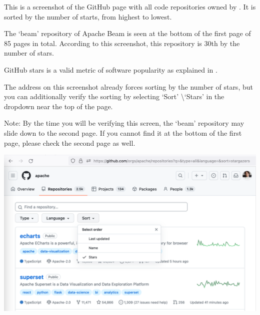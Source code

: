 
This is a screenshot of the GitHub page with all code repositories owned by \Asf.
It is sorted by the number of starts, from highest to lowest.

The `beam' repository of Apache Beam is seen at the bottom of the first page of 85 pages in total.
According to this screenshot, this repository is 30th by the number of stars.

GitHub stars is a valid metric of software popularity as explained in .

The address on this screenshot already forces sorting by the number of stars,
but you can additionally verify the sorting by selecting `Sort' \textbackslash `Stars'
in the dropdown near the top of the page.

Note: By the time you will be verifying this screen, the `beam' repository may slide down to the second page.
If you cannot find it at the bottom of the first page, please check the second page as well.

\begin{center}
    \includegraphics[width=40em]{beam-github-stars-dropdown-p1}
\end{center}
\WillContinue
\pagebreak


